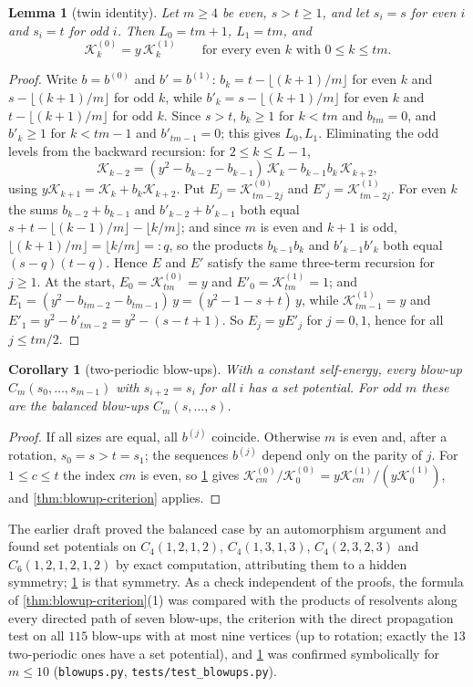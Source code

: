 \documentclass[11pt]{amsart}
\theoremstyle{plain}
\newtheorem{lemma}[theorem]{Lemma}
\newtheorem{corollary}[theorem]{Corollary}
\theoremstyle{definition}
\theoremstyle{remark}
\numberwithin{equation}{section}
\newcommand{\code}[1]{{\ttfamily\nolinkurl{#1}}}
\newcommand{\cont}{\mathcal{K}}           %
\begin{document}
\begin{lemma}[twin identity]\label{lem:twin}
Let $m\ge4$ be even, $s>t\ge1$, and let $s_i=s$ for even $i$ and $s_i=t$ for odd $i$. Then $L_0=tm+1$, $L_1=tm$, and
\[
\cont^{(0)}_k=y\,\cont^{(1)}_k\qquad\text{for every even }k\text{ with }0\le k\le tm.
\]
\end{lemma}
\begin{proof}
Write $b=b^{(0)}$ and $b'=b^{(1)}$: $b_k=t-\lfloor(k+1)/m\rfloor$ for even $k$ and $s-\lfloor(k+1)/m\rfloor$ for odd $k$, while $b'_k=s-\lfloor(k+1)/m\rfloor$ for even $k$ and $t-\lfloor(k+1)/m\rfloor$ for odd $k$. Since $s>t$, $b_k\ge1$ for $k<tm$ and $b_{tm}=0$, and $b'_k\ge1$ for $k<tm-1$ and $b'_{tm-1}=0$; this gives $L_0,L_1$. Eliminating the odd levels from the backward recursion: for $2\le k\le L-1$,
\[
\cont_{k-2}=(y^{2}-b_{k-2}-b_{k-1})\,\cont_k-b_{k-1}b_k\,\cont_{k+2},
\]
using $y\cont_{k+1}=\cont_k+b_k\cont_{k+2}$. Put $E_j=\cont^{(0)}_{tm-2j}$ and $E'_j=\cont^{(1)}_{tm-2j}$. For even $k$ the sums $b_{k-2}+b_{k-1}$ and $b'_{k-2}+b'_{k-1}$ both equal $s+t-\lfloor(k-1)/m\rfloor-\lfloor k/m\rfloor$; and since $m$ is even and $k+1$ is odd, $\lfloor(k+1)/m\rfloor=\lfloor k/m\rfloor=:q$, so the products $b_{k-1}b_k$ and $b'_{k-1}b'_k$ both equal $(s-q)(t-q)$. Hence $E$ and $E'$ satisfy the same three-term recursion for $j\ge1$. At the start, $E_0=\cont^{(0)}_{tm}=y$ and $E'_0=\cont^{(1)}_{tm}=1$; and $E_1=(y^{2}-b_{tm-2}-b_{tm-1})\,y=(y^{2}-1-s+t)\,y$, while $\cont^{(1)}_{tm-1}=y$ and $E'_1=y^{2}-b'_{tm-2}=y^{2}-(s-t+1)$. So $E_j=yE'_j$ for $j=0,1$, hence for all $j\le tm/2$.
\end{proof}

\begin{corollary}[two-periodic blow-ups]\label{cor:two-periodic}
With a constant self-energy, every blow-up $C_m(s_0,\dots,s_{m-1})$ with $s_{i+2}=s_i$ for all $i$ has a set potential. For odd $m$ these are the balanced blow-ups $C_m(s,\dots,s)$.
\end{corollary}
\begin{proof}
If all sizes are equal, all $b^{(j)}$ coincide. Otherwise $m$ is even and, after a rotation, $s_0=s>t=s_1$; the sequences $b^{(j)}$ depend only on the parity of $j$. For $1\le c\le t$ the index $cm$ is even, so \cref{lem:twin} gives $\cont^{(0)}_{cm}/\cont^{(0)}_0=y\cont^{(1)}_{cm}/(y\cont^{(1)}_0)$, and \cref{thm:blowup-criterion} applies.
\end{proof}

The earlier draft proved the balanced case by an automorphism argument and found set potentials on $C_4(1,2,1,2)$, $C_4(1,3,1,3)$, $C_4(2,3,2,3)$ and $C_6(1,2,1,2,1,2)$ by exact computation, attributing them to a hidden symmetry; \cref{lem:twin} is that symmetry. As a check independent of the proofs, the formula of \cref{thm:blowup-criterion}(1) was compared with the products of resolvents along every directed path of seven blow-ups, the criterion with the direct propagation test on all $115$ blow-ups with at most nine vertices (up to rotation; exactly the $13$ two-periodic ones have a set potential), and \cref{lem:twin} was confirmed symbolically for $m\le10$ (\code{blowups.py}, \code{tests/test_blowups.py}).
\end{document}
